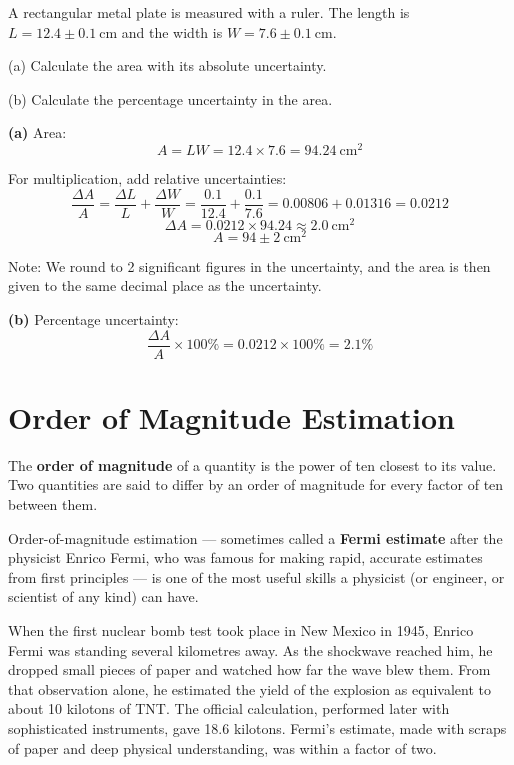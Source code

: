 \begin{examplebox}[1.8]
A rectangular metal plate is measured with a ruler. The
length is $L = 12.4 \pm 0.1\ \text{cm}$ and the width is
$W = 7.6 \pm 0.1\ \text{cm}$.

\smallskip

(a) Calculate the area with its absolute uncertainty.

(b) Calculate the percentage uncertainty in the area.
\end{examplebox}

\begin{solutionbox}
\textbf{(a)} Area:
\[
  A = LW = 12.4 \times 7.6 = 94.24\ \text{cm}^2
\]

For multiplication, add relative uncertainties:
\[
  \frac{\Delta A}{A} = \frac{\Delta L}{L}
  + \frac{\Delta W}{W}
  = \frac{0.1}{12.4} + \frac{0.1}{7.6}
  = 0.00806 + 0.01316 = 0.0212
\]
\[
  \Delta A = 0.0212 \times 94.24 \approx 2.0\ \text{cm}^2
\]
\[
  \boxed{A = 94 \pm 2\ \text{cm}^2}
\]

Note: We round to 2 significant figures in the uncertainty,
and the area is then given to the same decimal place as
the uncertainty.

\textbf{(b)} Percentage uncertainty:
\[
  \frac{\Delta A}{A} \times 100\%
  = 0.0212 \times 100\% = 2.1\%
\]
\end{solutionbox}

\section{Order of Magnitude Estimation}
\label{sec:order_of_magnitude}

\begin{definitionbox}
The \textbf{order of magnitude} of a quantity is the power
of ten closest to its value. Two quantities are said to
differ by an order of magnitude for every factor of ten
between them.
\end{definitionbox}

Order-of-magnitude estimation --- sometimes called a
\textbf{Fermi estimate} after the physicist Enrico Fermi,
who was famous for making rapid, accurate estimates from
first principles --- is one of the most useful skills a
physicist (or engineer, or scientist of any kind) can have.

\begin{historybox}
When the first nuclear bomb test took place in New Mexico
in 1945, Enrico Fermi was standing several kilometres away.
As the shockwave reached him, he dropped small pieces of
paper and watched how far the wave blew them. From that
observation alone, he estimated the yield of the explosion
as equivalent to about 10 kilotons of TNT. The official
calculation, performed later with sophisticated instruments,
gave 18.6 kilotons. Fermi's estimate, made with scraps of
paper and deep physical understanding, was within a factor
of two.
\end{historybox}

